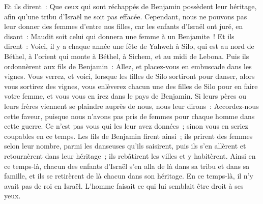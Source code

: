 \begin{multicols}{2}
Et ils dirent~: Que ceux qui sont réchappés de Benjamin possèdent leur héritage, afin qu'une tribu d'Israël ne soit pas effacée.
Cependant, nous ne pouvons pas leur donner des femmes d'entre nos filles, car les enfants d'Israël ont juré, en disant~: Maudit soit celui qui donnera une femme à un Benjamite~!
Et ils dirent~: Voici, il y a chaque année une fête de Yahweh à Silo, qui est au nord de Béthel, à l'orient qui monte à Béthel, à Sichem, et au midi de Lebona.
Puis ils ordonnèrent aux fils de Benjamin~: Allez, et placez-vous en embuscade dans les vignes.
Vous verrez, et voici, lorsque les filles de Silo sortiront pour danser, alors vous sortirez des vignes, vous enlèverez chacun une des filles de Silo pour en faire votre femme, et vous vous en irez dans le pays de Benjamin.
Si leurs pères ou leurs frères viennent se plaindre auprès de nous, nous leur dirons~: Accordez-nous cette faveur, puisque nous n'avons pas pris de femmes pour chaque homme dans cette guerre. Ce n'est pas vous qui les leur avez données~; sinon vous en seriez coupables en ce temps.
Les fils de Benjamin firent ainsi~; ils prirent des femmes selon leur nombre, parmi les danseuses qu'ils saisirent, puis ils s'en allèrent et retournèrent dans leur héritage~; ils rebâtirent les villes et y habitèrent.
Ainsi en ce temps-là, chacun des enfants d'Israël s'en alla de là dans sa tribu et dans sa famille, et ils se retirèrent de là chacun dans son héritage.
En ce temps-là, il n'y avait pas de roi en Israël. L'homme faisait ce qui lui semblait être droit à ses yeux.
\PPE{}
\end{multicols}
